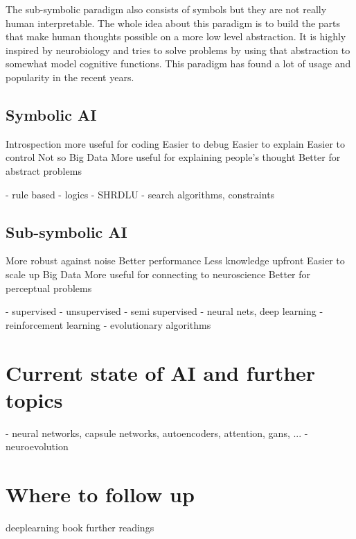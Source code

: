 \documentclass[jou,apacite]{apa6}
\begin{document}
The sub-symbolic paradigm also consists of symbols but they are not really human interpretable. The whole idea about this paradigm is to build the parts that make human thoughts possible on a more low level abstraction. It is highly inspired by neurobiology and tries to solve problems by using that abstraction to somewhat model cognitive functions. This paradigm has found a lot of usage and popularity in the recent years.

\subsection{Symbolic AI}
Introspection more useful
for coding
Easier to debug
Easier to explain
Easier to control
Not so Big Data
More useful for explaining
people’s thought
Better for abstract
problems

  - rule based
  - logics
  - SHRDLU
  - search algorithms, constraints

\subsection{Sub-symbolic AI}
More robust against noise
Better performance
Less knowledge upfront
Easier to scale up
Big Data
More useful for connecting to
neuroscience
Better for perceptual
problems

  - supervised
  - unsupervised
  - semi supervised
   - neural nets, deep learning
  - reinforcement learning
  - evolutionary algorithms

\section{Current state of AI and further topics}
 - neural networks, capsule networks, autoencoders, attention, gans, ...
 - neuroevolution

\section{Where to follow up}
deeplearning book
further readings

\printglossaries
\printindex

\end{document}
